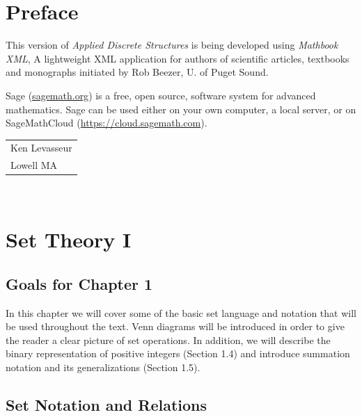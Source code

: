 \documentclass[10pt,]{book}
\theoremstyle{plain}
\theoremstyle{definition}
\theoremstyle{definition}
\theoremstyle{definition}
\theoremstyle{definition}
\begin{document}
\chapter*{Preface}\label{preface-1}
This version of \emph{Applied Discrete Structures} is being developed using \emph{Mathbook XML}, A lightweight XML application for authors of scientific articles, textbooks and monographs initiated by Rob Beezer, U. of Puget Sound.  %
\par
Sage (\href{http://sagemath.org}{sagemath.org}) is a free, open source, software system for advanced mathematics.  Sage can be used either on your own computer, a local server, or on SageMathCloud (\href{https://cloud.sagemath.com}{https://cloud.sagemath.com}). %
\par\hfill\begin{tabular}{l@{}}
Ken Levasseur\\
Lowell MA
\end{tabular}\\\par
\setcounter{tocdepth}{1}
\renewcommand*\contentsname{Contents}
\tableofcontents
\mainmatter
\typeout{************************************************}
\typeout{************************************************}
\chapter[Set Theory I]{Set Theory I}\label{chapter_5}
\typeout{************************************************}
\typeout{************************************************}
\section*{Goals for Chapter 1}
In this chapter we will cover some of the basic set language and notation that will be used throughout the text. Venn diagrams will be introduced in order to give the reader a clear picture of set operations. In addition, we will describe the binary representation of positive integers (Section 1.4) and introduce summation notation and its generalizations (Section 1.5).%
\typeout{************************************************}
\typeout{************************************************}
\section[Set Notation and Relations ]{Set Notation and Relations }\label{Set-Notation-and-Relations}
\typeout{************************************************}
\typeout{************************************************}
\end{document}
